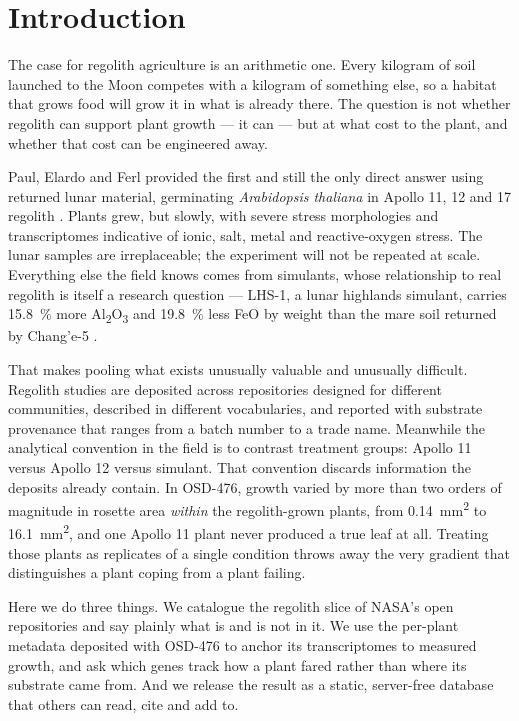 \documentclass[11pt,a4paper]{article}
\begin{document}
\section{Introduction}

The case for regolith agriculture is an arithmetic one. Every kilogram of soil launched
to the Moon competes with a kilogram of something else, so a habitat that grows food
will grow it in what is already there. The question is not whether regolith can support
plant growth --- it can --- but at what cost to the plant, and whether that cost can be
engineered away.

Paul, Elardo and Ferl provided the first and still the only direct answer using returned
lunar material, germinating \textit{Arabidopsis thaliana} in Apollo 11, 12 and 17
regolith \citep{paul2022apollo}. Plants grew, but slowly, with severe stress
morphologies and transcriptomes indicative of ionic, salt, metal and reactive-oxygen
stress. The lunar samples are irreplaceable; the experiment will not be repeated at
scale. Everything else the field knows comes from simulants, whose relationship to real
regolith is itself a research question --- LHS-1, a lunar highlands simulant, carries
\SI{15.8}{\percent} more Al\textsubscript{2}O\textsubscript{3} and
\SI{19.8}{\percent} less FeO by weight than the mare soil returned by Chang'e-5
\citep{exolithlhs1,li2022change5}.

That makes pooling what exists unusually valuable and unusually difficult. Regolith
studies are deposited across repositories designed for different communities, described
in different vocabularies, and reported with substrate provenance that ranges from a
batch number to a trade name. Meanwhile the analytical convention in the field is to
contrast treatment groups: Apollo 11 versus Apollo 12 versus simulant. That convention
discards information the deposits already contain. In OSD-476, growth varied by more
than two orders of magnitude in rosette area \emph{within} the regolith-grown plants,
from \SI{0.14}{\milli\metre\squared} to \SI{16.1}{\milli\metre\squared}, and one Apollo 11
plant never produced a true leaf at all. Treating those plants as replicates of a single
condition throws away the very gradient that distinguishes a plant coping from a plant
failing.

Here we do three things. We catalogue the regolith slice of NASA's open repositories and
say plainly what is and is not in it. We use the per-plant metadata deposited with
OSD-476 to anchor its transcriptomes to measured growth, and ask which genes track how
a plant fared rather than where its substrate came from. And we release the result as a
static, server-free database that others can read, cite and add to.
\end{document}
